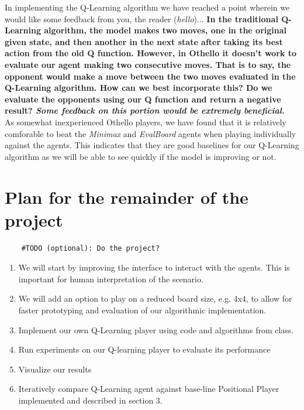 \documentclass{article}
\begin{document}
In implementing the Q-Learning algorithm we have reached a point wherein we would like some feedback from you, the reader (\textit{hello})... \textbf{In the traditional Q-Learning algorithm, the model makes two moves, one in the original given state, and then another in the next state after taking its best action from the old Q function. However, in Othello it doesn't work to evaluate our agent making two consecutive moves. That is to say, the opponent would make a move between the two moves evaluated in the Q-Learning algorithm. How can we best incorporate this? Do we evaluate the opponents using our Q function and return a negative result? \textit{Some feedback on this portion would be extremely beneficial.}}\\
As somewhat inexperienced Othello players, we have found that it is relatively comforable to beat the \textit{Minimax} and \textit{EvalBoard} agents when playing individually against the agents. This indicates that they are good baselines for our Q-Learning algorithm as we will be able to see quickly if the model is improving or not.

\section{Plan for the remainder of the project}
\begin{verbatim}
    #TODO (optional): Do the project?
\end{verbatim}
\begin{enumerate}
    \item We will start by improving the interface to interact with the agents. This is important for human interpretation of the scenario.
    \item We will add an option to play on a reduced board size, e.g. 4x4, to allow for faster prototyping and evaluation of our algorithmic implementation.
    \item Implement our own Q-Learning player using code and algorithms from class.
    \item Run experiments on our Q-learning player to evaluate its performance
    \item Visualize our results
    \item Iteratively compare Q-Learning agent against base-line Positional Player implemented and described in section 3.
\end{enumerate}
\end{document}
